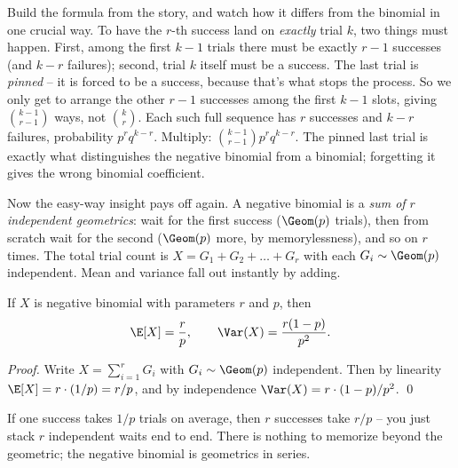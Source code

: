\begin{whybox}
Build the formula from the story, and watch how it differs from the binomial in
one crucial way. To have the $r$-th success land on \emph{exactly} trial $k$, two
things must happen. First, among the first $k-1$ trials there must be exactly
$r-1$ successes (and $k-r$ failures); second, trial $k$ itself must be a success.
The last trial is \emph{pinned} -- it is forced to be a success, because that's
what stops the process. So we only get to arrange the other $r-1$ successes among
the first $k-1$ slots, giving $\binom{k-1}{r-1}$ ways, not $\binom{k}{r}$. Each
such full sequence has $r$ successes and $k-r$ failures, probability
$p^r q^{k-r}$. Multiply: $\binom{k-1}{r-1} p^r q^{k-r}$. The pinned last trial is
exactly what distinguishes the negative binomial from a binomial; forgetting it
gives the wrong binomial coefficient.
\end{whybox}

Now the easy-way insight pays off again. A negative binomial is a \emph{sum of
$r$ independent geometrics}: wait for the first success ($\Geom(p)$ trials), then
from scratch wait for the second ($\Geom(p)$ more, by memorylessness), and so on
$r$ times. The total trial count is $X = G_1 + G_2 + \dots + G_r$ with each
$G_i \sim \Geom(p)$ independent. Mean and variance fall out instantly by adding.

\begin{proposition}
\label{ch07:negbinom-mv}
If $X$ is negative binomial with parameters $r$ and $p$, then
\[
  \E[X] = \frac{r}{p}, \qquad \Var(X) = \frac{r(1-p)}{p^{2}}.
\]
\end{proposition}

\begin{proof}
Write $X = \sum_{i=1}^{r} G_i$ with $G_i \sim \Geom(p)$ independent. Then by
linearity $\E[X] = r \cdot (1/p) = r/p$, and by independence
$\Var(X) = r \cdot (1-p)/p^2$. \qed
\end{proof}

\begin{intuitionbox}
If one success takes $1/p$ trials on average, then $r$ successes take $r/p$ -- you
just stack $r$ independent waits end to end. There is nothing to memorize beyond
the geometric; the negative binomial is geometrics in series.
\end{intuitionbox}

